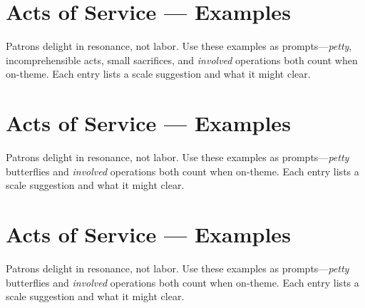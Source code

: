 
\section{Acts of Service — Examples}\label{sec:acts-of-service-table}

Patrons delight in resonance, not labor. Use these examples as prompts—\emph{petty}, incomprehensible acts, small sacrifices,  and \emph{involved} operations both count when on-theme. Each entry lists a scale suggestion and what it might clear.


\section{Acts of Service — Examples}\label{sec:acts-of-service-table}

Patrons delight in resonance, not labor. Use these examples as prompts—\emph{petty} butterflies and \emph{involved} operations both count when on-theme. Each entry lists a scale suggestion and what it might clear.


\section{Acts of Service — Examples}\label{sec:acts-of-service-table}

Patrons delight in resonance, not labor. Use these examples as prompts---\emph{petty} butterflies and \emph{involved} operations both count when on-theme. Each entry lists a scale suggestion and what it might clear.

